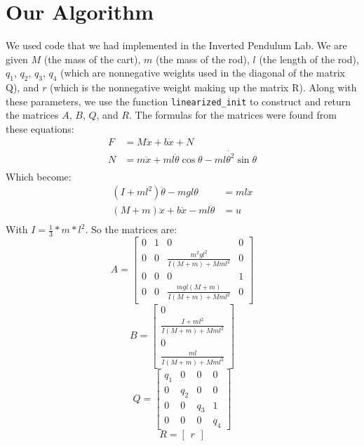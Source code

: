 \documentclass{hitec}
\begin{document}
	
	\section{Our Algorithm}
	We used code that we had implemented in the Inverted Pendulum Lab. We are given $M$ (the mass of the cart), $m$ (the mass of the rod), $l$ (the length of the rod), $q_1$, $q_2$, $q_3$, $q_4$ (which are nonnegative weights used in the diagonal of the matrix Q), and $r$ (which is the nonnegative weight making up the matrix R). Along with these parameters, we use the function \texttt{linearized\_init} to construct and return the matrices $A$, $B$, $Q$, and $R$.
	The formulas for the matrices were found from these equations:
	\begin{align}
	F&=M\ddot{x}+b\dot{x}+N                                  \\
	N&=m\ddot{x}+ ml\ddot{\theta}\cos{\theta}-ml\dot{\theta^2}\sin{\theta} \\
	\end{align}
	Which become:
	\begin{align}
	(I + ml^2)\ddot{\theta}-mgl\theta&=ml\ddot{x} \\
	(M+m)\ddot{x}+b\dot{x}-ml\ddot{\theta}&=u     \\
	\end{align}
	With $I=\frac{1}{3}*m*l^2$. So the matrices are:
	\[
	A=
	\begin{bmatrix}
	0 & 1 & 0                              & 0 \\
	0 & 0 & \frac{m^2gl^2}{I(M+m)+Mml^2}  & 0 \\
	0 & 0 & 0                              & 1 \\
	0 & 0 & \frac{mgl(M+m)}{I(M+m)+Mml^2}  & 0
	\end{bmatrix}
	\]
	\[
	B=
	\begin{bmatrix}
	0                           \\
	\frac{I+ml^2}{I(M+m)+Mml^2} \\
	0                           \\
	\frac{ml}{I(M+m)+Mml^2}
	\end{bmatrix}
	\]
	\[
	Q=
	\begin{bmatrix}
	q_1 & 0   & 0   & 0 \\
	0   & q_2 & 0   & 0 \\
	0   & 0   & q_3 & 1 \\
	0   & 0   & 0   & q_4
	\end{bmatrix}
	\]
	\[
	R=
	\begin{bmatrix}
	r
	\end{bmatrix}
	\]
\end{document}
